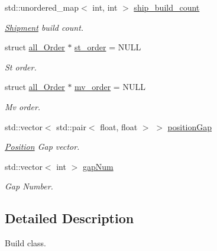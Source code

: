 \begin{DoxyCompactItemize}
std\+::unordered\+\_\+map$<$ int, int $>$ \hyperlink{classBuildClass_a46932efd4c8b2b97d0624a6117b40ee0}{ship\+\_\+build\+\_\+count}
\begin{DoxyCompactList}\small\item\em \hyperlink{structShipment}{Shipment} build count. \end{DoxyCompactList}\item 
\mbox{\label{classBuildClass_afee9ec162b045de467138097c913ab3a}} 
struct \hyperlink{structall__Order}{all\+\_\+\+Order} $\ast$ \hyperlink{classBuildClass_afee9ec162b045de467138097c913ab3a}{st\+\_\+order} = N\+U\+LL
\begin{DoxyCompactList}\small\item\em St order. \end{DoxyCompactList}\item 
\mbox{\label{classBuildClass_a97f473aacf55fc9e2f036df24f14a5ad}} 
struct \hyperlink{structall__Order}{all\+\_\+\+Order} $\ast$ \hyperlink{classBuildClass_a97f473aacf55fc9e2f036df24f14a5ad}{mv\+\_\+order} = N\+U\+LL
\begin{DoxyCompactList}\small\item\em Mv order. \end{DoxyCompactList}\item 
\mbox{\label{classBuildClass_ad2928c00304dde02561cdfd214f5ada2}} 
std\+::vector$<$ std\+::pair$<$ float, float $>$ $>$ \hyperlink{classBuildClass_ad2928c00304dde02561cdfd214f5ada2}{position\+Gap}
\begin{DoxyCompactList}\small\item\em \hyperlink{structPosition}{Position} Gap vector. \end{DoxyCompactList}\item 
\mbox{\label{classBuildClass_a85c6af17d47644b2353b81dfc3399200}} 
std\+::vector$<$ int $>$ \hyperlink{classBuildClass_a85c6af17d47644b2353b81dfc3399200}{gap\+Num}
\begin{DoxyCompactList}\small\item\em Gap Number. \end{DoxyCompactList}\end{DoxyCompactItemize}


\subsection{Detailed Description}
Build class. 


